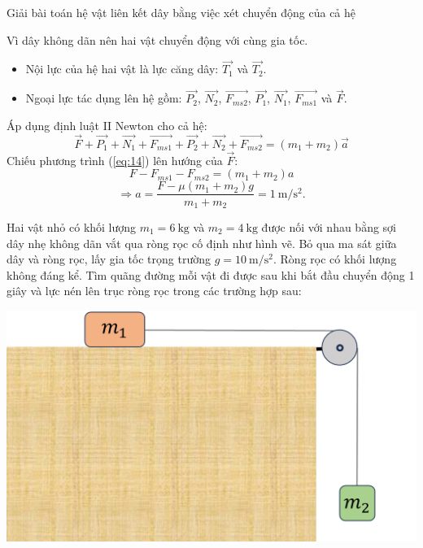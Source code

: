 \begin{dang}{Giải bài toán hệ vật liên kết dây bằng việc xét chuyển động của cả hệ}
{	\begin{center}
	\end{center}
	Vì dây không dãn nên hai vật chuyển động với cùng gia tốc.
	\begin{itemize}
		\item Nội lực của hệ hai vật là lực căng dây: $\overrightarrow{T_1}$ và $\overrightarrow{T_2}$.
		\item Ngoại lực tác dụng lên hệ gồm: $\overrightarrow{P_2}$, $\overrightarrow{N_2}$, $\overrightarrow{F_{ms2}}$, $\overrightarrow{P_1}$, $\overrightarrow{N_1}$, $\overrightarrow{F_{ms1}}$ và $\overrightarrow{F}$.
	\end{itemize}
	Áp dụng định luật II Newton cho cả hệ:
	\begin{equation}
		\label{eq:14}
		\overrightarrow{F}+\overrightarrow{P_1}+\overrightarrow{N_1}+\overrightarrow{F_{ms1}}+\overrightarrow{P_2}+\overrightarrow{N_2}+\overrightarrow{F_{ms2}}=\left(m_1+m_2\right)\vec{a}
	\end{equation}
Chiếu phương trình (\ref{eq:14}) lên hướng của $\overrightarrow{F}$:
$$F-F_{ms1}-F_{ms2}=\left(m_1+m_2\right)a$$
$$\Rightarrow a=\dfrac{F-\mu\left(m_1+m_2\right)g}{m_1+m_2}=\SI{1}{\meter/\second^2}.$$
}
{Hai vật nhỏ có khối lượng $m_1=\SI{6}{\kilogram}$ và $m_2=\SI{4}{\kilogram}$ được nối với nhau bằng sợi dây nhẹ không dãn vắt qua ròng rọc cố định như hình vẽ. Bỏ qua ma sát giữa dây và ròng rọc, lấy gia tốc trọng trường $g=\SI{10}{\meter/\second^2}$. Ròng rọc có khối lượng không đáng kể. Tìm quãng đường mỗi vật đi được sau khi bắt đầu chuyển động 1 giây và lực nén lên trục ròng rọc trong các trường hợp sau:
	\begin{center}
		\includegraphics[width=0.4\linewidth]{../figs/VN10-2023-PH-TP021-1}
	\end{center}
	\begin{enumerate}[label=\alph*)]

\end{enumerate}}
\end{dang}
